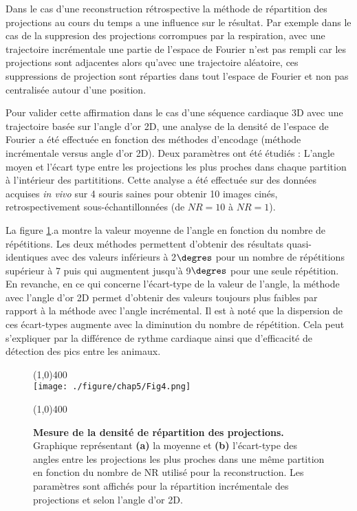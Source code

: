 Dans le cas d'une reconstruction rétrospective la méthode de répartition des projections au cours du temps a une influence sur le résultat. Par exemple dans le cas de la suppresion des projections corrompues par la respiration, avec une trajectoire incrémentale une partie de l'espace de Fourier n'est pas rempli car les projections sont adjacentes alors qu'avec une trajectoire aléatoire, ces suppressions de projection sont réparties dans tout l'espace de Fourier et non pas centralisée autour d'une position. 

Pour valider cette affirmation dans le cas d'une séquence cardiaque 3D avec une trajectoire basée sur l'angle d'or 2D, une analyse de la densité de l'espace de Fourier a été effectuée en fonction des méthodes d'encodage (méthode incrémentale versus angle d'or 2D). Deux paramètres ont été étudiés : L'angle moyen et l'écart type entre les projections les plus proches dans chaque partition à l'intérieur des partititions. Cette analyse a été effectuée sur des données acquises \textit{in vivo} sur 4 souris saines pour obtenir 10 images cinés, retrospectivement sous-échantillonnées (de $NR = 10$ à $NR = 1$).

La figure \ref{fig:GoldVSIncNr}.a montre la valeur moyenne de l'angle en fonction du nombre de répétitions. Les deux méthodes permettent d'obtenir des résultats quasi-identiques avec des valeurs inférieurs à 2$\degres$ pour un nombre de répétitions supérieur à 7 puis qui augmentent jusqu'à 9$\degres$ pour une seule répétition. En revanche, en ce qui concerne l'écart-type de la valeur de l'angle, la méthode avec l'angle d'or 2D permet d'obtenir des valeurs toujours plus faibles par rapport à la méthode avec l'angle incrémental. Il est à noté que la dispersion de ces écart-types augmente avec la diminution du nombre de répétition. Cela peut s'expliquer par la différence de rythme cardiaque ainsi que d'efficacité de détection des pics entre les animaux.

\begin{figure}[H]
\centering
\line(1,0){400} \\
\texttt{[image: ./figure/chap5/Fig4.png]}
\caption[Mesure de la densité de répartition des projections.]{\label{fig:GoldVSIncNr} \textbf{Mesure de la densité de répartition des projections.} Graphique représentant \textbf{(a)} la moyenne et \textbf{(b)} l'écart-type des angles entre les projections les plus proches dans une même partition en fonction du nombre de NR utilisé pour la reconstruction. Les paramètres sont affichés pour la répartition incrémentale des projections et selon l'angle d'or 2D.}
\line(1,0){400} \\ 
\end{figure}

